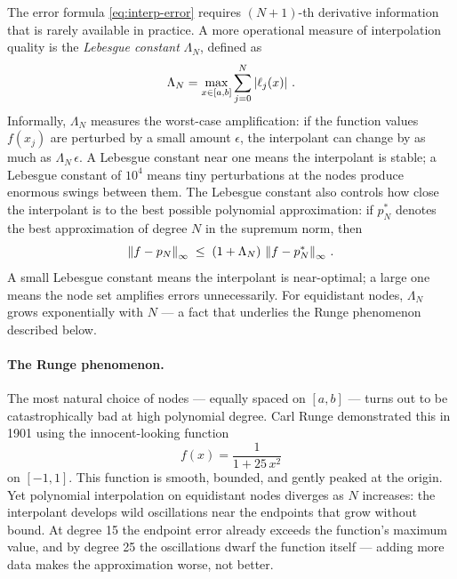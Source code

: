 The error formula \cref{eq:interp-error} requires $(N+1)$-th
derivative information that is rarely available in practice.  A more
operational measure of interpolation quality is the \emph{Lebesgue
constant} $\Lambda_N$, defined as
%
\begin{equation}
  \Lambda_N
    = \max_{x \in [a,b]}
      \sum_{j=0}^{N} \left\lvert \ell_j(x) \right\rvert \,.
  \label{eq:lebesgue-constant}
\end{equation}
%
Informally, $\Lambda_N$ measures the worst-case amplification: if the
function values $f(x_j)$ are perturbed by a small amount $\epsilon$,
the interpolant can change by as much as $\Lambda_N\,\epsilon$.  A
Lebesgue constant near one means the interpolant is stable; a
Lebesgue constant of $10^4$ means tiny perturbations at the nodes
produce enormous swings between them.  The Lebesgue constant also
controls how close the interpolant is to the best possible polynomial
approximation: if $p_N^*$ denotes the best approximation of degree $N$
in the supremum norm, then
%
\begin{equation}
  \left\lVert f - p_N \right\rVert_\infty
    \;\leq\; (1 + \Lambda_N)\,\left\lVert f - p_N^* \right\rVert_\infty \,.
  \label{eq:lebesgue-bound}
\end{equation}
%
A small Lebesgue constant means the interpolant is near-optimal;
a large one means the node set amplifies errors unnecessarily.  For
equidistant nodes, $\Lambda_N$ grows exponentially with $N$ --- a fact
that underlies the Runge phenomenon described below.

\paragraph{The Runge phenomenon.}

The most natural choice of nodes --- equally spaced on $[a, b]$ ---
turns out to be catastrophically bad at high polynomial degree.  Carl
Runge demonstrated this in 1901 using the innocent-looking function
%
\begin{equation}
  f(x) = \frac{1}{1 + 25\,x^2}
  \label{eq:runge-function}
\end{equation}
%
on $[-1, 1]$.  This function is smooth, bounded, and gently peaked at
the origin.  Yet polynomial interpolation on equidistant nodes
diverges as $N$ increases: the interpolant develops wild oscillations
near the endpoints that grow without bound.  At degree 15 the
endpoint error already exceeds the function's maximum value, and by
degree 25 the oscillations dwarf the function itself --- adding more
data makes the approximation worse, not better.

